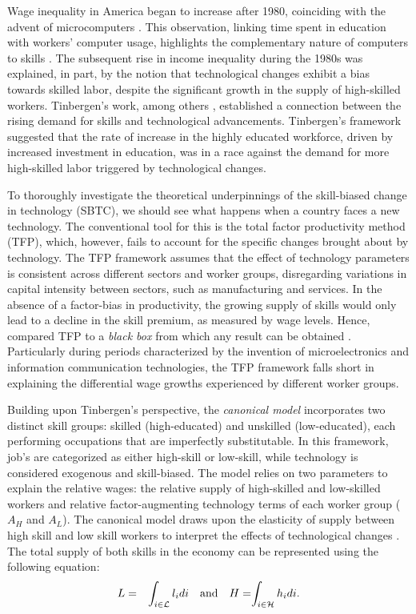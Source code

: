 \begin{onehalfspace}
Wage inequality in America began to increase after 1980, coinciding
with the advent of microcomputers \citep{2000Katz_INBOOK}. This observation,
linking time spent in education with workers' computer usage, highlights
the complementary nature of computers to skills \citep{1993Krueger}.
The subsequent rise in income inequality during the 1980s was explained,
in part, by the notion that technological changes exhibit a bias towards
skilled labor, despite the significant growth in the supply of high-skilled
workers. Tinbergen's \citeyearpar{1974Tinbergen} work, among others
\citep{1969Griliches,1970Welch}, established a connection between
the rising demand for skills and technological advancements. Tinbergen's
framework suggested that the rate of increase in the highly educated
workforce, driven by increased investment in education, was in a race
against the demand for more high-skilled labor triggered by technological
changes.

To thoroughly investigate the theoretical underpinnings of the skill-biased
change in technology (SBTC), we should see what happens when a country
faces a new technology. The conventional tool for this is the total
factor productivity method (TFP), which, however, fails to account
for the specific changes brought about by technology. The TFP framework
assumes that the effect of technology parameters is consistent across
different sectors and worker groups, disregarding variations in capital
intensity between sectors, such as manufacturing and services. In
the absence of a factor-bias in productivity, the growing supply of
skills would only lead to a decline in the skill premium, as measured
by wage levels. Hence, \citet{Hornstein2005} compared TFP to a \emph{black
box} from which any result can be obtained \citep{1999Bresnahan}.
Particularly during periods characterized by the invention of microelectronics
and information communication technologies, the TFP framework falls
short in explaining the differential wage growths experienced by different
worker groups.

Building upon Tinbergen's \citeyearpar{1974Tinbergen} perspective,
the \emph{canonical model} \citep[hereafter AA]{Acemoglu2011} incorporates
two distinct skill groups: skilled (high-educated) and unskilled (low-educated),
each performing occupations that are imperfectly substitutable. In
this framework, job's are categorized as either high-skill or low-skill,
while technology is considered exogenous and skill-biased. The model
relies on two parameters to explain the relative wages: the relative
supply of high-skilled and low-skilled workers and relative factor-augmenting
technology terms of each worker group ($A_{H}$ and $A_{L}$). The
canonical model draws upon the elasticity of supply between high skill
and low skill workers to interpret the effects of technological changes
\citet{2002Acemoglu}. The total supply of both skills in the economy
can be represented using the following equation:
\begin{eqnarray*}
L & = & \int_{i\in\mathcal{L}}l_{i}di\quad\text{and\quad\ensuremath{H=}\ensuremath{\int_{i\in\mathcal{H}}h_{i}}\ensuremath{di}.}
\end{eqnarray*}
 


\end{onehalfspace}
